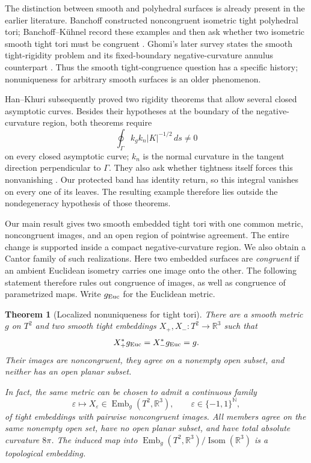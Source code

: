 \documentclass[11pt]{amsart}
\newtheorem{theorem}{Theorem}[section]
\theoremstyle{definition}
\theoremstyle{remark}
\newcommand{\R}{\mathbb R}\newcommand{\Sph}{\mathbb S}
\DeclareMathOperator{\Isom}{Isom}\DeclareMathOperator{\Emb}{Emb}
\numberwithin{equation}{section}
\begin{document}
The distinction between smooth and polyhedral surfaces is already
present in the earlier literature. Banchoff constructed noncongruent
isometric tight polyhedral tori; Banchoff--K\"uhnel record these examples
and then ask whether two isometric smooth tight tori must be congruent
\cite[Example~1.6.2 and Question~11]{BK}. Ghomi's later survey states
the smooth tight-rigidity problem and its fixed-boundary
negative-curvature annulus counterpart \cite[Problems~1.2--1.3]{GhomiProblems}.
Thus the smooth tight-congruence question has a specific history;
nonuniqueness for arbitrary smooth surfaces is an older phenomenon.

Han--Khuri subsequently proved two rigidity theorems that allow several
closed asymptotic curves. Besides their hypotheses at the boundary of
the negative-curvature region, both theorems require
\[
 \oint_\Gamma k_gk_n|K|^{-1/2}\,ds\ne0
\]
on every closed asymptotic curve; $k_n$ is the normal curvature in the
tangent direction perpendicular to $\Gamma$. They also ask whether
tightness itself forces this nonvanishing \cite[Theorems~1--2 and the
following remark]{HK}. Our protected band has identity return, so this
integral vanishes on every one of its leaves. The resulting example
therefore lies outside the nondegeneracy hypothesis of those theorems.

Our main result gives two smooth embedded tight tori with one common
metric, noncongruent images, and an open region of pointwise agreement.
The entire change is supported inside a compact negative-curvature
region. We also obtain a Cantor family of such realizations.
Here two embedded surfaces are \emph{congruent} if an ambient Euclidean
isometry carries one image onto the other. The following statement therefore
rules out congruence of images, as well as congruence of parametrized maps.
Write $g_{\rm Euc}$ for the Euclidean metric.

\begin{theorem}[Localized nonuniqueness for tight tori]\label{thm:main-fiber}
There are a smooth metric $g$ on $T^2$ and two smooth tight embeddings
$X_+,X_-:T^2\to\R^3$ such that
\[
 X_+^*g_{\rm Euc}=X_-^*g_{\rm Euc}=g.
\]
Their images are noncongruent, they agree on a nonempty open subset, and
neither has an open planar subset.

In fact, the same metric can be chosen to admit a continuous family
\[
 \varepsilon\longmapsto X_\varepsilon\in\Emb_g(T^2,\R^3),
 \qquad \varepsilon\in\{-1,1\}^{\mathbb N},
\]
of tight embeddings with pairwise noncongruent images. All members agree
on the same nonempty open set, have no open planar subset, and have total
absolute curvature $8\pi$. The induced map into
$\Emb_g(T^2,\R^3)/\Isom(\R^3)$ is a topological embedding.
\end{theorem}
\end{document}
